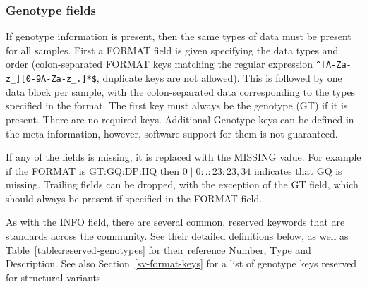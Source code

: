 \documentclass[8pt]{article}
\begin{document}
\subsubsection{Genotype fields}
If genotype information is present, then the same types of data must be present for all samples.
First a FORMAT field is given specifying the data types and order (colon-separated FORMAT keys matching the regular expression \texttt{\^{}[A-Za-z\_][0-9A-Za-z\_.]*\$}, duplicate keys are not allowed).
This is followed by one data block per sample, with the colon-separated data corresponding to the types specified in the format.
The first key must always be the genotype (GT) if it is present.
There are no required keys.
Additional Genotype keys can be defined in the meta-information, however, software support for them is not guaranteed.

If any of the fields is missing, it is replaced with the MISSING value.
For example if the FORMAT is GT:GQ:DP:HQ then $0\mid0:.:23:23,34$ indicates that GQ is missing.
Trailing fields can be dropped, with the exception of the GT field, which should always be present if specified in the FORMAT field.


As with the INFO field, there are several common, reserved keywords that are standards across the community.
See their detailed definitions below, as well as Table~\ref{table:reserved-genotypes} for their reference Number, Type and Description.
See also Section~\ref{sv-format-keys} for a list of genotype keys reserved for structural variants.
\end{document}
